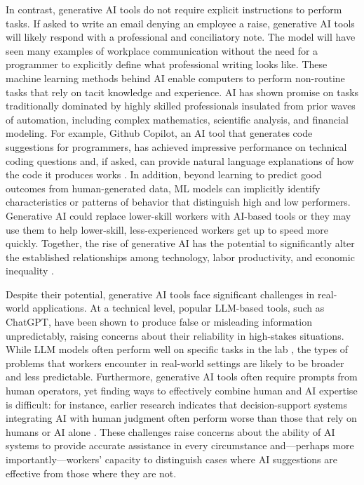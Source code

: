 \documentclass[11pt]{article}
\begin{document}
In contrast, generative AI tools do not require explicit instructions to perform tasks. If asked to write an email denying an employee a raise, generative AI tools will likely respond with a professional and conciliatory note. The model will have seen many examples of workplace communication without the need for a programmer to explicitly define what professional writing looks like. These machine learning methods behind AI enable computers to perform non-routine tasks that rely on tacit knowledge and experience. AI has shown promise on tasks traditionally dominated by highly skilled professionals insulated from prior waves of automation, including complex mathematics, scientific analysis, and financial modeling. For example, Github Copilot, an AI tool that generates code suggestions for programmers, has achieved impressive performance on technical coding questions and, if asked, can provide natural language explanations of how the code it produces works \citep{nguyen2022a, zhao2023}. In addition, beyond learning to predict good outcomes from human-generated data, ML models can implicitly identify characteristics or patterns of behavior that distinguish high and low performers. Generative AI could replace lower-skill workers with AI-based tools or they may use them to help lower-skill, less-experienced workers get up to speed more quickly. Together, the rise of generative AI has the potential to significantly alter the established relationships among technology, labor productivity, and economic inequality \citep{whitehouse2022}.

Despite their potential, generative AI tools face significant challenges in real-world applications.  At a technical level, popular LLM-based tools, such as ChatGPT, have been shown to produce false or misleading information unpredictably, raising concerns about their reliability in high-stakes situations.  While LLM models often perform well on specific tasks in the lab \citep{GPT4TechnicalReport2023, peng2023impact, noyExperimentalEvidenceProductivity2023}, the types of problems that workers encounter in real-world settings are likely to be broader and less predictable.  Furthermore, generative AI tools often require prompts from human operators, yet finding ways to effectively combine human and AI expertise is difficult: for instance, earlier research indicates that decision-support systems integrating AI with human judgment often perform worse than those that rely on humans or AI alone \citep{vaccaro2024combinationshumansaiuseful}. These challenges raise concerns about the ability of AI systems to provide accurate assistance in every circumstance and---perhaps more importantly---workers' capacity to distinguish cases where AI suggestions are effective from those where they are not.  
\end{document}
